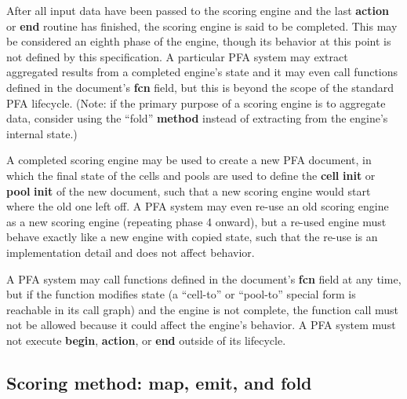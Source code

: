 \documentclass{article}
\newcommand{\PFAc}{\ttfamily\bfseries}
\theoremstyle{definition}
\begin{document}
After all input data have been passed to the scoring engine and the last {\PFAc action} or {\PFAc end} routine has finished, the scoring engine is said to be completed.  This may be considered an eighth phase of the engine, though its behavior at this point is not defined by this specification.  A particular PFA system may extract aggregated results from a completed engine's state and it may even call functions defined in the document's {\PFAc fcn} field, but this is beyond the scope of the standard PFA lifecycle.  (Note: if the primary purpose of a scoring engine is to aggregate data, consider using the ``fold'' {\PFAc method} instead of extracting from the engine's internal state.)

A completed scoring engine may be used to create a new PFA document, in which the final state of the cells and pools are used to define the {\PFAc cell} {\PFAc init} or {\PFAc pool} {\PFAc init} of the new document, such that a new scoring engine would start where the old one left off.  A PFA system may even re-use an old scoring engine as a new scoring engine (repeating phase 4 onward), but a re-used engine must behave exactly like a new engine with copied state, such that the re-use is an implementation detail and does not affect behavior.

A PFA system may call functions defined in the document's {\PFAc fcn} field at any time, but if the function modifies state (a ``cell-to'' or ``pool-to'' special form is reachable in its call graph) and the engine is not complete, the function call must not be allowed because it could affect the engine's behavior.  A PFA system must not execute {\PFAc begin}, {\PFAc action}, or {\PFAc end} outside of its lifecycle.

\hypertarget{hsec:method}{}
\subsection{Scoring method: map, emit, and fold}
\label{sec:method}
\end{document}
